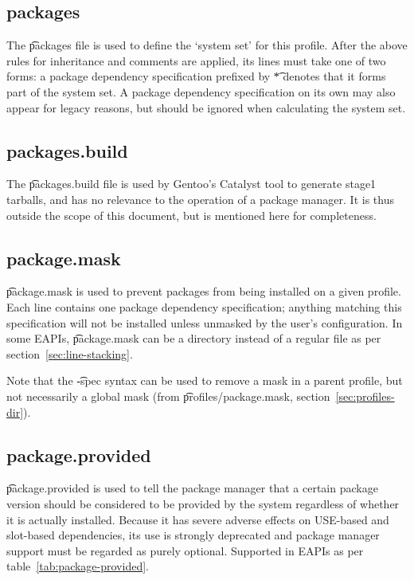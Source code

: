 \subsection{packages}
The \t{packages} file is used to define the `system set' for this profile.
After the above rules for inheritance and comments are applied, its lines must take one of two
forms: a package dependency specification prefixed by \t{*} denotes that it forms part of the
system set. A package dependency specification on its own may also appear for legacy reasons, but
should be ignored when calculating the system set.

\subsection{packages.build}
The \t{packages.build} file is used by Gentoo's Catalyst tool to generate stage1 tarballs, and has
no relevance to the operation of a package manager. It is thus outside the scope of this document,
but is mentioned here for completeness.

\subsection{package.mask}
\t{package.mask} is used to prevent packages from being installed on a given profile. Each line
contains one package dependency specification; anything matching this specification will not be
installed unless unmasked by the user's configuration. In some EAPIs, \t{package.mask} can be a
directory instead of a regular file as per section~\ref{sec:line-stacking}.

Note that the \t{-spec} syntax can be used to remove a mask in a parent profile, but not
necessarily a global mask (from \t{profiles/package.mask}, section~\ref{sec:profiles-dir}).


\subsection{package.provided}
 \t{package.provided} is used to tell the package manager that
a certain package version should be considered to be provided by the system regardless of whether
it is actually installed. Because it has severe adverse effects on USE-based and slot-based
dependencies, its use is strongly deprecated and package manager support must be regarded as purely
optional. Supported in EAPIs as per table~\ref{tab:package-provided}.


